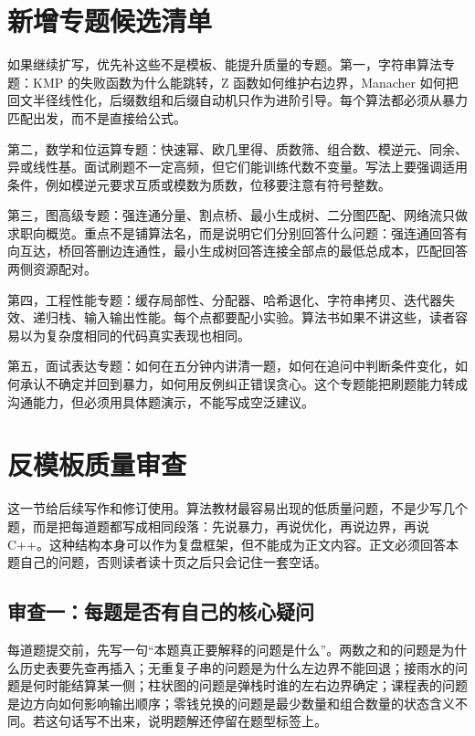 \section{新增专题候选清单}

如果继续扩写，优先补这些不是模板、能提升质量的专题。第一，字符串算法专题：KMP 的失败函数为什么能跳转，Z 函数如何维护右边界，Manacher 如何把回文半径线性化，后缀数组和后缀自动机只作为进阶引导。每个算法都必须从暴力匹配出发，而不是直接给公式。

第二，数学和位运算专题：快速幂、欧几里得、质数筛、组合数、模逆元、同余、异或线性基。面试刷题不一定高频，但它们能训练代数不变量。写法上要强调适用条件，例如模逆元要求互质或模数为质数，位移要注意有符号整数。

第三，图高级专题：强连通分量、割点桥、最小生成树、二分图匹配、网络流只做求职向概览。重点不是铺算法名，而是说明它们分别回答什么问题：强连通回答有向互达，桥回答删边连通性，最小生成树回答连接全部点的最低总成本，匹配回答两侧资源配对。

第四，工程性能专题：缓存局部性、分配器、哈希退化、字符串拷贝、迭代器失效、递归栈、输入输出性能。每个点都要配小实验。算法书如果不讲这些，读者容易以为复杂度相同的代码真实表现也相同。

第五，面试表达专题：如何在五分钟内讲清一题，如何在追问中判断条件变化，如何承认不确定并回到暴力，如何用反例纠正错误贪心。这个专题能把刷题能力转成沟通能力，但必须用具体题演示，不能写成空泛建议。

\section{反模板质量审查}

这一节给后续写作和修订使用。算法教材最容易出现的低质量问题，不是少写几个题，而是把每道题都写成相同段落：先说暴力，再说优化，再说边界，再说 C++。这种结构本身可以作为复盘框架，但不能成为正文内容。正文必须回答本题自己的问题，否则读者读十页之后只会记住一套空话。

\subsection{审查一：每题是否有自己的核心疑问}

每道题提交前，先写一句“本题真正要解释的问题是什么”。两数之和的问题是为什么历史表要先查再插入；无重复子串的问题是为什么左边界不能回退；接雨水的问题是何时能结算某一侧；柱状图的问题是弹栈时谁的左右边界确定；课程表的问题是边方向如何影响输出顺序；零钱兑换的问题是最少数量和组合数量的状态含义不同。若这句话写不出来，说明题解还停留在题型标签上。

